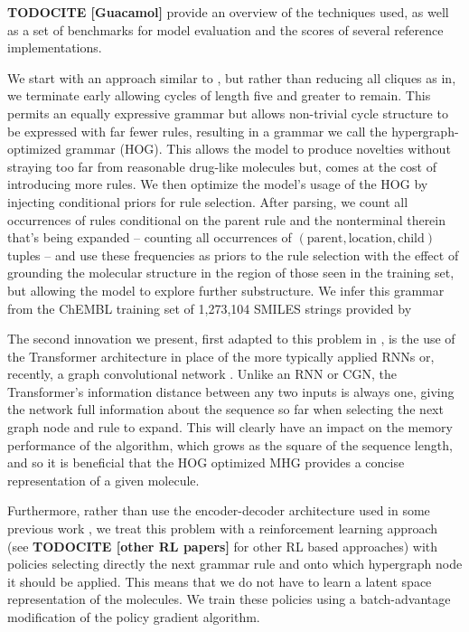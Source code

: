 \documentclass{article}
\newcommand{\CITE}[1]{{\bf TODOCITE [#1]}}
\begin{document}
\CITE{Guacamol} provide an overview of the techniques used, as well as a set of benchmarks for model evaluation and the scores of several reference implementations.

We start with an approach similar to  \cite{kajino2018}, but rather than reducing all cliques as in, we terminate early allowing cycles of length five and greater to remain. This permits an equally expressive grammar but allows non-trivial cycle structure to be expressed with far fewer rules, resulting in a grammar we call the hypergraph-optimized grammar (HOG). This allows the model to produce novelties without straying too far from reasonable drug-like molecules but, comes at the cost of introducing more rules. We then optimize the model's usage of the HOG by injecting conditional priors for rule selection. After parsing, we count all occurrences of rules conditional on the parent rule and the nonterminal therein that's being expanded -- counting all occurrences of $(\text{parent}, \text{location}, \text{child})$ tuples -- and use these frequencies as priors to the rule selection with the effect of grounding the molecular structure in the region of those seen in the training set, but allowing the model to explore further substructure. We infer this grammar from the ChEMBL training set of 1,273,104 SMILES strings provided by \cite{pogany2019}

The second innovation we present, first adapted to this problem in \cite{kraev2018}, is the use of the Transformer architecture \cite{vaswani2017} in place of the more typically applied RNNs \cite{yang2017, olivecrona2017} or, recently, a graph convolutional network \cite{you2018}. Unlike an RNN or CGN, the Transformer's information distance between any two inputs is always one, giving the network full information about the sequence so far when selecting the next graph node and rule to expand. This will clearly have an impact on the memory performance of the algorithm, which grows as the square of the sequence length, and so it is beneficial that the HOG optimized MHG provides a concise representation of a given molecule.

Furthermore, rather than use the encoder-decoder architecture used in some previous work \cite{dai2018, jin2018, simonovsky2018, kusner2017, gomezbombarelli2016}, we treat this problem with a reinforcement learning approach (see \cite{popova2018} \CITE{other RL papers} for other RL based approaches) with policies selecting directly the next grammar rule and onto which hypergraph node it should be applied. This means that we do not have to learn a latent space representation of the molecules. We train these policies using a batch-advantage modification of the policy gradient algorithm.
\end{document}
